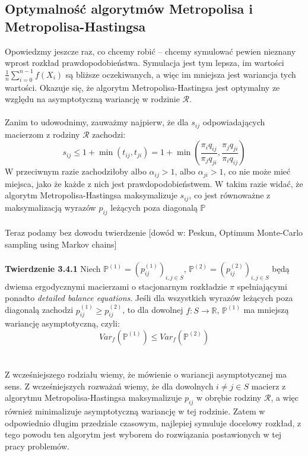 \documentclass[a4paper]{article}
\begin{document}
\subsection{Optymalność algorytmów Metropolisa i Metropolisa-Hastingsa}
Opowiedzmy jeszcze raz, co chcemy robić – chcemy symulować pewien nieznany wprost rozkład prawdopodobieństwa. Symulacja jest tym lepsza, im wartości $\frac{1}{n}\sum\limits_{i = 0}^{n-1} f(X_i)$ są bliższe oczekiwanych, a więc im mniejsza jest wariancja tych wartości. Okazuje się, że algorytm Metropolisa-Hastingsa jest optymalny ze względu na asymptotyczną wariancję w rodzinie $\mathcal{R}$.\\\\
Zanim to udowodnimy, zauważmy najpierw, że dla $s_{ij}$ odpowiadających macierzom z rodziny $\mathcal{R}$ zachodzi:
$$s_{ij} \leq 1 + \min(t_{ij}, t_{ji}) = 1 + \min\left(\frac{\pi_i q_{ij}}{\pi_j q_{ji}}, \frac{\pi_j q_{ji}}{\pi_i q_{ij}}\right)$$
W przeciwnym razie zachodziłoby albo $\alpha_{ij} > 1$, albo $\alpha_{ji} > 1$, co nie może mieć miejsca, jako że każde z nich jest prawdopodobieństwem. W takim razie widać, że algorytm Metropolisa-Hastingsa maksymalizuje $s_{ij}$, co jest równoważne z maksymalizacją wyrazów $p_{ij}$ leżących poza diagonalą $\mathbb{P}$\\\\
Teraz podamy bez dowodu twierdzenie [dowód w: Peskun, Optimum Monte-Carlo sampling using Markov chains]\\
\\
\textbf{Twierdzenie 3.4.1}
Niech $\mathbb{P}^{(1)} = (p_{ij}^{(1)})_{i,j \in S}$, $\mathbb{P}^{(2)}= (p_{ij}^{(2)})_{i,j \in S}$ będą dwiema ergodycznymi macierzami o stacjonarnym rozkładzie $\pi$ spełniającymi ponadto \textit{detailed balance equations}. Jeśli dla wszystkich wyrazów leżących poza diagonalą zachodzi $p_{ij}^{(1)} \geq p_{ij}^{(2)}$, to dla dowolnej $f: S \to \mathbb{R}$,  $\mathbb{P}^{(1)}$ ma mniejszą wariancję asymptotyczną, czyli:
$$Var_f(\mathbb{P}^{(1)}) \leq Var_f(\mathbb{P}^{(2)})$$
\\\\
Z wcześniejszego rodziału wiemy, że mówienie o wariancji asymptotycznej ma sens. Z wcześniejszych rozważań wiemy, że dla dowolnych $i \neq j \in S$ macierz z algorytmu Metropolisa-Hastingsa maksymalizuje $p_{ij}$ w obrębie rodziny $\mathcal{R}$, a więc również minimalizuje asymptotyczną wariancję w tej rodzinie. Zatem w odpowiednio długim przedziale czasowym, najlepiej symuluje docelowy rozkład, z tego powodu ten algorytm jest wyborem do rozwiązania postawionych w tej pracy problemów.\\\\
\end{document}
